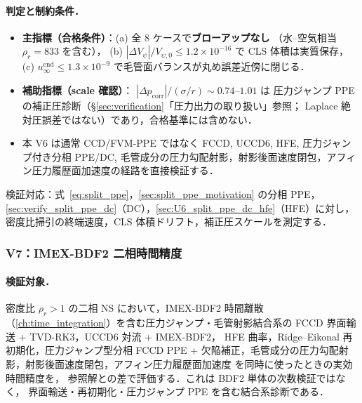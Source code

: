 \paragraph{判定と制約条件．}
\begin{itemize}\setlength{\itemsep}{0pt}
  \item \textbf{主指標（合格条件）}：(a) 全 $8$ ケースで\textbf{ブローアップなし}
        （水--空気相当 $\rho_r=833$ を含む）\checkmark，
        (b) $|\Delta V_\psi|/V_{\psi,0} \le 1.2\times10^{-16}$ で CLS 体積は実質保存\checkmark，
        (c) $u_\infty^{\mathrm{end}}\le 1.3\times10^{-9}$ で毛管面バランスが丸め誤差近傍に閉じる\checkmark．
  \item \textbf{補助指標（scale 確認）}：
        $|\Delta p_{\mathrm{corr}}|/(\sigma/r) \sim 0.74$--$1.01$ は
        圧力ジャンプ PPE の補正圧診断（§\ref{sec:verification}「圧力出力の取り扱い」参照；
        Laplace 絶対圧誤差ではない）であり，合格基準には含めない．
  \item 本 V6 は通常 CCD/FVM-PPE ではなく
        FCCD, UCCD6, HFE, 圧力ジャンプ付き分相 PPE/DC,
        毛管成分の圧力勾配射影，射影後面速度閉包，アフィン圧力履歴面加速度の経路を直接検証する．
\end{itemize}
検証対応：式~\eqref{eq:split_ppe}，\autoref{sec:split_ppe_motivation} の分相 PPE，
\autoref{sec:verify_split_ppe_dc}（DC），\autoref{sec:U6_split_ppe_dc_hfe}（HFE）に対し，
密度比掃引の終端速度，CLS 体積ドリフト，補正圧スケールを測定する．

\FloatBarrier

\subsubsection{V7：IMEX-BDF2 二相時間精度}
\label{sec:imex_bdf2_twophase_time}

\paragraph{検証対象．}
密度比 $\rho_r > 1$ の二相 NS において，IMEX-BDF2 時間離散~\cite{AscherRuuthSpiteri1997,HairerWanner1996}
（\autoref{ch:time_integration}）を含む圧力ジャンプ・毛管射影結合系の
FCCD 界面輸送 + TVD-RK3，UCCD6 対流 + IMEX-BDF2，
HFE 曲率，Ridge--Eikonal 再初期化，圧力ジャンプ型分相
FCCD PPE + 欠陥補正，毛管成分の圧力勾配射影，射影後面速度閉包，アフィン圧力履歴面加速度
を同時に使ったときの実効時間精度を，
参照解との差で評価する．これは BDF2 単体の次数検証ではなく，
界面輸送・再初期化・圧力ジャンプ PPE を含む結合系診断である．

